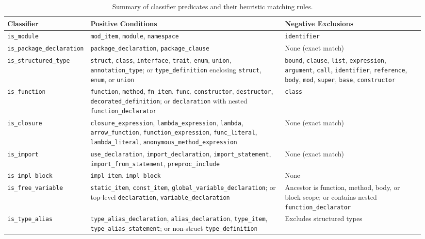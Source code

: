 \begin{table}[htpb]
  \centering
  \footnotesize
  \begin{tabularx}{\textwidth}{|l|Y|Y|}
    \hline
    \textbf{Classifier} & \textbf{Positive Conditions} &
    \textbf{Negative Exclusions} \\ \hline
    \texttt{is\_module} & \texttt{mod\_item}, \texttt{module},
    \texttt{namespace} & \texttt{identifier} \\ \hline
    \texttt{is\_package\_declaration} & \texttt{package\_declaration},
    \texttt{package\_clause} & None (exact match) \\ \hline
    \texttt{is\_structured\_type} & \texttt{struct}, \texttt{class},
    \texttt{interface}, \texttt{trait}, \texttt{enum}, \texttt{union},
    \texttt{annotation\_type}; or \texttt{type\_definition} enclosing
    \texttt{struct}, \texttt{enum}, or \texttt{union} &
    \texttt{bound}, \texttt{clause}, \texttt{list}, \texttt{expression},
    \texttt{argument}, \texttt{call}, \texttt{identifier},
    \texttt{reference}, \texttt{body}, \texttt{mod}, \texttt{super},
    \texttt{base}, \texttt{constructor} \\ \hline
    \texttt{is\_function} & \texttt{function}, \texttt{method},
    \texttt{fn\_item}, \texttt{func}, \texttt{constructor},
    \texttt{destructor}, \texttt{decorated\_definition}; or
    \texttt{declaration} with nested
    \texttt{function\_declarator} & \texttt{class} \\ \hline
    \texttt{is\_closure} & \texttt{closure\_expression},
    \texttt{lambda\_expression}, \texttt{lambda}, \texttt{arrow\_function},
    \texttt{function\_expression}, \texttt{func\_literal},
    \texttt{lambda\_literal}, \texttt{anonymous\_method\_}\-\texttt{expression}
    & None (exact match) \\ \hline
    \texttt{is\_import} & \texttt{use\_declaration},
    \texttt{import\_declaration},
    \texttt{import\_statement}, \texttt{import\_from\_statement},
    \texttt{preproc\_include} & None (exact match) \\ \hline
    \texttt{is\_impl\_block} & \texttt{impl\_item},
    \texttt{impl\_block} & None \\ \hline
    \texttt{is\_free\_variable} & \texttt{static\_item}, \texttt{const\_item},
    \texttt{global\_variable\_}\-\texttt{declaration}; or top-level
    \texttt{declaration},
    \texttt{variable\_declaration} & Ancestor is function, method,
    body, or block scope;
    or contains nested \texttt{function\_declarator} \\ \hline
    \texttt{is\_type\_alias} & \texttt{type\_alias\_declaration},
    \texttt{alias\_declaration},
    \texttt{type\_item}, \texttt{type\_alias\_statement}; or non-struct
    \texttt{type\_definition} & Excludes structured types \\ \hline
  \end{tabularx}
  \caption{Summary of classifier predicates and their heuristic matching rules.}
  \label{tab:classifiers}
\end{table}

